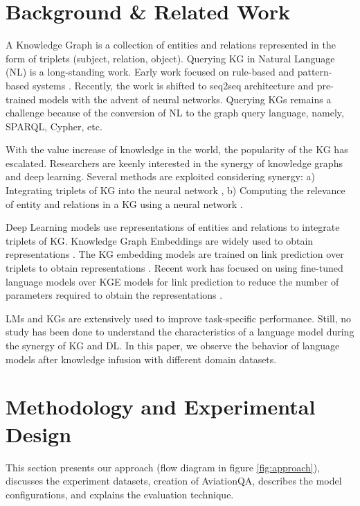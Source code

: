 \documentclass[11pt]{article}
\begin{document}
\section{ Background \& Related Work} \label{related work}




A Knowledge Graph is a collection of entities and relations represented in the form of triplets (subject, relation, object). Querying KG in Natural Language (NL) is a long-standing work. Early work focused on rule-based and pattern-based systems \cite{affolter2019comparative}. Recently, the work is shifted to seq2seq architecture \cite{zhong2017seq2sql} and pre-trained models with the advent of neural networks. Querying KGs remains a challenge because of the conversion of NL to the graph query language, namely, SPARQL, Cypher, etc.
\par
With the value increase of knowledge in the world, the popularity of the KG has escalated. Researchers are keenly interested in the synergy of knowledge graphs and deep learning. Several methods are exploited considering synergy: a) Integrating triplets of KG into the neural network \cite{Liu2020KBERTEL, saxena2022sequence}, b) Computing the relevance of entity and relations in a KG using a neural network \cite{sun-etal-2019-pullnet, yasunaga2021qa}.
\par 
Deep Learning models use representations of entities and relations to integrate triplets of KG. Knowledge Graph Embeddings are widely used to obtain representations \cite{KGESurveyelectronics9050750}. The KG embedding models are trained on link prediction over triplets to obtain representations \cite{LinkPredictionsym13030485}. Recent work has focused on using fine-tuned language models over KGE models for link prediction to reduce the number of parameters required to obtain the representations \cite{saxena2022sequence}.
\par
LMs and KGs are extensively used to improve task-specific performance. Still, no study has been done to understand the characteristics of a language model during the synergy of KG and DL.  
In this paper, we observe the behavior of language models after knowledge infusion with different domain datasets.  

\section{Methodology and Experimental Design}
This section presents our approach (flow diagram in figure \ref{fig:approach}), discusses the experiment datasets, creation of AviationQA, describes the model configurations, and explains the evaluation technique.
\end{document}
